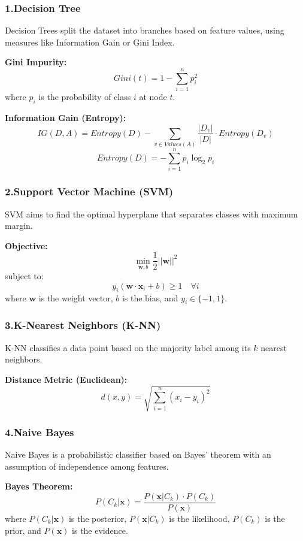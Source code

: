 \subsubsection*{1.Decision Tree}

Decision Trees split the dataset into branches based on feature values, using measures like Information Gain or Gini Index.

\textbf{Gini Impurity:}
\[
Gini(t) = 1 - \sum_{i=1}^{n} p_i^2
\]
where \( p_i \) is the probability of class \( i \) at node \( t \).

\textbf{Information Gain (Entropy):}
\[
IG(D, A) = Entropy(D) - \sum_{v \in Values(A)} \frac{|D_v|}{|D|} \cdot Entropy(D_v)
\]
\[
Entropy(D) = - \sum_{i=1}^{n} p_i \log_2 p_i
\]

\subsubsection*{2.Support Vector Machine (SVM)}

SVM aims to find the optimal hyperplane that separates classes with maximum margin.

\textbf{Objective:}
\[
\min_{\mathbf{w}, b} \frac{1}{2} ||\mathbf{w}||^2
\]
subject to:
\[
y_i(\mathbf{w} \cdot \mathbf{x}_i + b) \geq 1 \quad \forall i
\]
where \( \mathbf{w} \) is the weight vector, \( b \) is the bias, and \( y_i \in \{-1, 1\} \).

\subsubsection*{3.K-Nearest Neighbors (K-NN)}

K-NN classifies a data point based on the majority label among its \( k \) nearest neighbors.

\textbf{Distance Metric (Euclidean):}
\[
d(x, y) = \sqrt{\sum_{i=1}^{n}(x_i - y_i)^2}
\]

\subsubsection*{4.Naive Bayes}

Naive Bayes is a probabilistic classifier based on Bayes’ theorem with an assumption of independence among features.

\textbf{Bayes Theorem:}
\[
P(C_k | \mathbf{x}) = \frac{P(\mathbf{x} | C_k) \cdot P(C_k)}{P(\mathbf{x})}
\]
where \( P(C_k | \mathbf{x}) \) is the posterior, \( P(\mathbf{x} | C_k) \) is the likelihood, \( P(C_k) \) is the prior, and \( P(\mathbf{x}) \) is the evidence.

